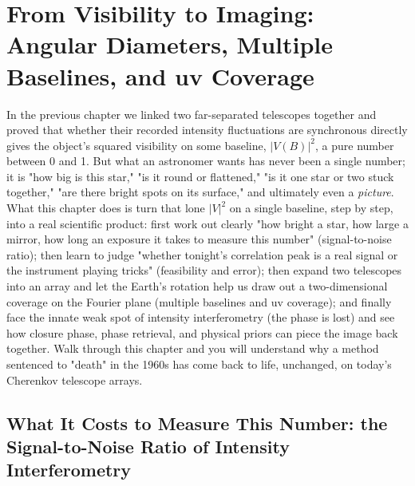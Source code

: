 \chapter{From Visibility to Imaging: Angular Diameters, Multiple Baselines, and uv Coverage}
\label{chap:e11}

\begin{chapteropening}
In the previous chapter we linked two far-separated telescopes together and proved that whether their recorded intensity fluctuations are synchronous directly gives the object's squared visibility on some baseline, \(|V(B)|^2\), a pure number between 0 and 1. But what an astronomer wants has never been a single number; it is "how big is this star," "is it round or flattened," "is it one star or two stuck together," "are there bright spots on its surface," and ultimately even a \emph{picture}. What this chapter does is turn that lone \(|V|^2\) on a single baseline, step by step, into a real scientific product: first work out clearly "how bright a star, how large a mirror, how long an exposure it takes to measure this number" (signal-to-noise ratio); then learn to judge "whether tonight's correlation peak is a real signal or the instrument playing tricks" (feasibility and error); then expand two telescopes into an array and let the Earth's rotation help us draw out a two-dimensional coverage on the Fourier plane (multiple baselines and uv coverage); and finally face the innate weak spot of intensity interferometry (the phase is lost) and see how closure phase, phase retrieval, and physical priors can piece the image back together. Walk through this chapter and you will understand why a method sentenced to "death" in the 1960s has come back to life, unchanged, on today's Cherenkov telescope arrays.
\end{chapteropening}

\section{What It Costs to Measure This Number: the Signal-to-Noise Ratio of Intensity Interferometry}
\label{sec:e11-snr}

